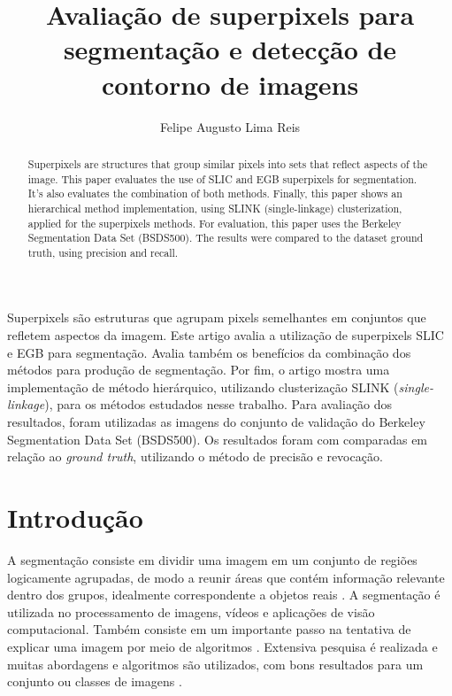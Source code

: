\title{Avaliação de superpixels para segmentação e detecção de contorno de imagens}
\author{Felipe Augusto Lima Reis\inst{1}}
\begin{document}
 

\maketitle

\begin{abstract}
  Superpixels are structures that group similar pixels into sets that reflect aspects of the image. This paper evaluates the use of SLIC and EGB superpixels for segmentation. It's also evaluates the combination of both methods. Finally, this paper shows an hierarchical method implementation, using SLINK (single-linkage) clusterization, applied for the superpixels methods. For evaluation, this paper uses the Berkeley Segmentation Data Set (BSDS500). The results were compared to the dataset ground truth, using precision and recall.
\end{abstract}
     
\begin{resumo} 
  Superpixels são estruturas que agrupam pixels semelhantes em conjuntos que refletem aspectos da imagem. Este artigo avalia a utilização de superpixels SLIC e EGB para segmentação. Avalia também os benefícios da combinação dos métodos para produção de segmentação. Por fim, o artigo mostra uma implementação de método hierárquico, utilizando clusterização SLINK (\textit{single-linkage}), para os métodos estudados nesse trabalho. Para avaliação dos resultados, foram utilizadas as imagens do conjunto de validação do Berkeley Segmentation Data Set (BSDS500). Os resultados foram com comparadas em relação ao \textit{ground truth}, utilizando o método de precisão e revocação.
\end{resumo}


\section{Introdução} \label{sec:introducao}

A segmentação consiste em dividir uma imagem em um conjunto de regiões logicamente agrupadas, de modo a reunir áreas que contém informação relevante dentro dos grupos, idealmente correspondente a objetos reais \cite{DOMINGUEZ} \cite{ZHANG2008}. A segmentação é utilizada no processamento de imagens, vídeos e aplicações de visão computacional. Também consiste em um importante passo na tentativa de explicar uma imagem por meio de algoritmos \cite{ZHANG2008}. Extensiva pesquisa é realizada e muitas abordagens e algoritmos são utilizados, com bons resultados para um conjunto ou classes de imagens \cite{ZHANG2008}. 
\end{document}
